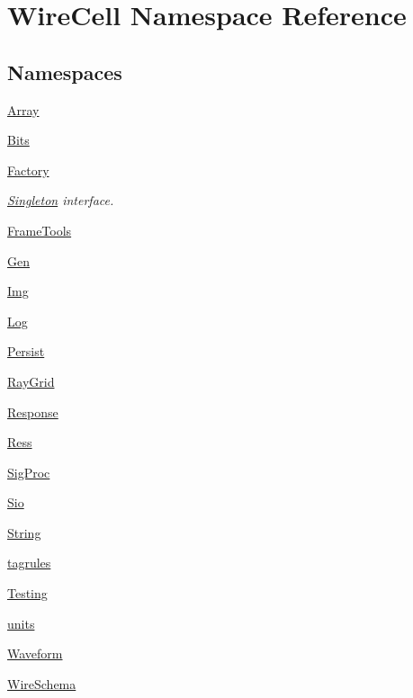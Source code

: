 \hypertarget{namespace_wire_cell}{}\section{Wire\+Cell Namespace Reference}
\label{namespace_wire_cell}
\subsection*{Namespaces}
\begin{DoxyCompactItemize}
\item 
 \hyperlink{namespace_wire_cell_1_1_array}{Array}
\item 
 \hyperlink{namespace_wire_cell_1_1_bits}{Bits}
\item 
 \hyperlink{namespace_wire_cell_1_1_factory}{Factory}
\begin{DoxyCompactList}\small\item\em \hyperlink{class_wire_cell_1_1_singleton}{Singleton} interface. \end{DoxyCompactList}\item 
 \hyperlink{namespace_wire_cell_1_1_frame_tools}{Frame\+Tools}
\item 
 \hyperlink{namespace_wire_cell_1_1_gen}{Gen}
\item 
 \hyperlink{namespace_wire_cell_1_1_img}{Img}
\item 
 \hyperlink{namespace_wire_cell_1_1_log}{Log}
\item 
 \hyperlink{namespace_wire_cell_1_1_persist}{Persist}
\item 
 \hyperlink{namespace_wire_cell_1_1_ray_grid}{Ray\+Grid}
\item 
 \hyperlink{namespace_wire_cell_1_1_response}{Response}
\item 
 \hyperlink{namespace_wire_cell_1_1_ress}{Ress}
\item 
 \hyperlink{namespace_wire_cell_1_1_sig_proc}{Sig\+Proc}
\item 
 \hyperlink{namespace_wire_cell_1_1_sio}{Sio}
\item 
 \hyperlink{namespace_wire_cell_1_1_string}{String}
\item 
 \hyperlink{namespace_wire_cell_1_1tagrules}{tagrules}
\item 
 \hyperlink{namespace_wire_cell_1_1_testing}{Testing}
\item 
 \hyperlink{namespace_wire_cell_1_1units}{units}
\item 
 \hyperlink{namespace_wire_cell_1_1_waveform}{Waveform}
\item 
 \hyperlink{namespace_wire_cell_1_1_wire_schema}{Wire\+Schema}
\end{DoxyCompactItemize}
